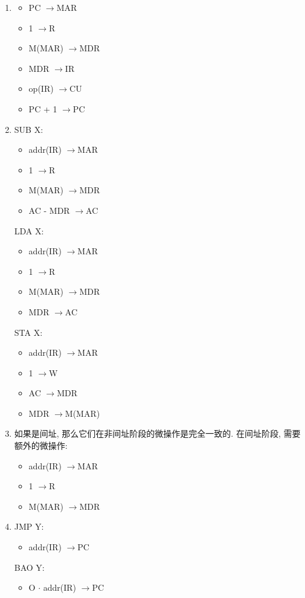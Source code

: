 \documentclass[UTF8]{report}
\newenvironment{solution}{{\noindent\hskip 2em \bf 解 \quad}}{}
\renewcommand{\to}{$\rightarrow$}
\begin{document}
\begin{solution}
    \begin{enumerate}[label=(\arabic*)]
        \item
        \begin{itemize}
            \item PC \to MAR
            \item 1 \to R
            \item M(MAR) \to MDR
            \item MDR \to IR
            \item op(IR) \to CU
            \item PC + 1 \to PC
        \end{itemize}

        \item SUB X:
        \begin{itemize}
            \item addr(IR) \to MAR
            \item 1 \to R
            \item M(MAR) \to MDR
            \item AC - MDR \to AC
        \end{itemize}
        LDA X:
        \begin{itemize}
            \item addr(IR) \to MAR
            \item 1 \to R
            \item M(MAR) \to MDR
            \item MDR \to AC
        \end{itemize}
        STA X:
        \begin{itemize}
            \item addr(IR) \to MAR
            \item 1 \to W
            \item AC \to MDR
            \item MDR \to M(MAR)
        \end{itemize}

        \item 如果是间址, 那么它们在非间址阶段的微操作是完全一致的. 在间址阶段, 需要额外的微操作:
        \begin{itemize}
            \item addr(IR) \to MAR
            \item 1 \to R
            \item M(MAR) \to MDR
        \end{itemize}

        \item JMP Y:
        \begin{itemize}
            \item addr(IR) \to PC
        \end{itemize}
        BAO Y:
        \begin{itemize}
            \item O $\cdot$ addr(IR) \to PC
        \end{itemize}

    \end{enumerate}
\end{solution}
\end{document}
